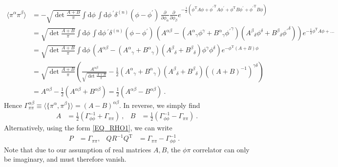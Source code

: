 \documentclass[letter]{article}
\newcommand{\intd}[1]{\int\mathrm{d}#1\,}
\begin{document}
\begin{align}
\langle \pi^\alpha \pi^\beta \rangle &= - \sqrt{\det\frac{A+B}{\pi}} \intd\phi \intd\phi^\prime  \delta^{(n)}(\phi - \phi^\prime)\, \frac{\partial}{\partial\phi_\alpha} \frac{\partial}{\partial\phi_\beta} e^{ -\frac{1}{2} (\phi^\mathrm{T} A \phi + {\phi^\prime}^\mathrm{T} A \phi^\prime + \phi^\mathrm{T} B \phi^\prime  + {\phi^\prime}^\mathrm{T} B \phi )} \nonumber\\
&= \sqrt{\det\frac{A+B}{\pi}} \intd\phi \intd\phi^\prime  \delta^{(n)}(\phi - \phi^\prime)\, \left( A^{\alpha\beta} - ({A^\alpha}_\gamma\phi^\gamma + {B^\alpha}_\gamma{\phi^\prime}^\gamma) ({A^\beta}_\delta \phi^\delta + {B^\beta}_\delta {\phi^\prime}^\delta) \right) e^{ -\frac{1}{2} \phi^\mathrm{T} A \phi + \dots } \nonumber\\
&= \sqrt{\det\frac{A+B}{\pi}} \intd\phi \left( A^{\alpha\beta} - ({A^\alpha}_\gamma + {B^\alpha}_\gamma) ({A^\beta}_\delta + {B^\beta}_\delta) \phi^\gamma\phi^\delta  \right) e^{ -\phi^\mathrm{T} (A+B) \phi} \nonumber\\
&= \sqrt{\det\frac{A+B}{\pi}} \left( \frac{A^{\alpha\beta}}{\sqrt{\det\frac{A+B}{\pi}}} - \frac{1}{2} ({A^\alpha}_\gamma + {B^\alpha}_\gamma) ({A^\beta}_\delta + {B^\beta}_\delta) ((A+B)^{-1})^{\gamma\delta} \right) \nonumber\\
&= A^{\alpha\beta} - \frac{1}{2} \left( A^{\alpha\beta} + B^{\alpha\beta} \right) = \frac{1}{2} \left( A^{\alpha\beta} - B^{\alpha\beta} \right)\ .
\end{align}
Hence $\Gamma^{\alpha\beta}_{\pi\pi} \equiv \langle \{ \pi^\alpha, \pi^\beta \} \rangle = (A-B)^{\alpha\beta}$.
In reverse, we simply find
\begin{align}
A &= \frac{1}{2} \left( \Gamma_{\phi\phi}^{-1} + \Gamma_{\pi\pi} \right)\ , &
B &= \frac{1}{2} \left( \Gamma_{\phi\phi}^{-1} - \Gamma_{\pi\pi} \right)\ .
\end{align}
Alternatively, using the form \eqref{EQ_RHO1}, we can write
\begin{align}
P &= \Gamma_{\pi\pi} , &
Q R^{-1} Q^\mathrm{T} &= \Gamma_{\pi\pi} - \Gamma_{\phi\phi}^{-1} \ . &
\end{align}
Note that due to our assumption of real matrices $A,B$, the $\phi\pi$ correlator can only be imaginary, and must therefore vanish.
\end{document}
